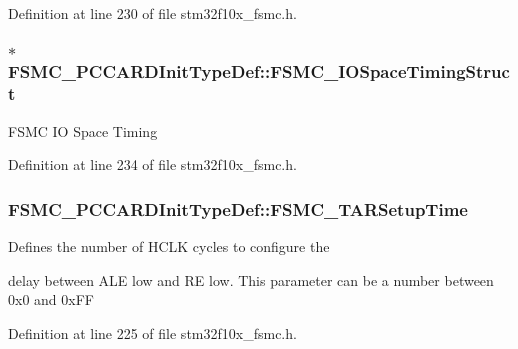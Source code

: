 Definition at line 230 of file stm32f10x\-\_\-fsmc.\-h.

\hypertarget{struct_f_s_m_c___p_c_c_a_r_d_init_type_def_a34514ae2564eb2eb0cd46e5bbf05b607}{
\subsubsection[{F\-S\-M\-C\-\_\-\-I\-O\-Space\-Timing\-Struct}]{ $\ast$ F\-S\-M\-C\-\_\-\-P\-C\-C\-A\-R\-D\-Init\-Type\-Def\-::\-F\-S\-M\-C\-\_\-\-I\-O\-Space\-Timing\-Struct}}\label{struct_f_s_m_c___p_c_c_a_r_d_init_type_def_a34514ae2564eb2eb0cd46e5bbf05b607}
F\-S\-M\-C I\-O Space Timing 

Definition at line 234 of file stm32f10x\-\_\-fsmc.\-h.

\hypertarget{struct_f_s_m_c___p_c_c_a_r_d_init_type_def_ac83f977e01623595e0aa8dd0b1eb3fcc}{
\subsubsection[{F\-S\-M\-C\-\_\-\-T\-A\-R\-Setup\-Time}]{ F\-S\-M\-C\-\_\-\-P\-C\-C\-A\-R\-D\-Init\-Type\-Def\-::\-F\-S\-M\-C\-\_\-\-T\-A\-R\-Setup\-Time}}\label{struct_f_s_m_c___p_c_c_a_r_d_init_type_def_ac83f977e01623595e0aa8dd0b1eb3fcc}
\begin{DoxyVerb}   Defines the number of HCLK cycles to configure the
\end{DoxyVerb}
 delay between A\-L\-E low and R\-E low. This parameter can be a number between 0x0 and 0x\-F\-F 

Definition at line 225 of file stm32f10x\-\_\-fsmc.\-h.

